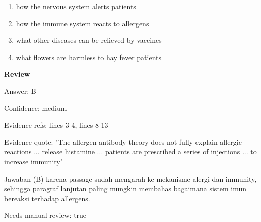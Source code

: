 \documentclass[12pt]{article}
\begin{document}
\begin{enumerate}[label=(\Alph*),leftmargin=*,itemsep=0.2em]
\item how the nervous system alerts patients
\item how the immune system reacts to allergens
\item what other diseases can be relieved by vaccines
\item what flowers are harmless to hay fever patients
\end{enumerate}
\par
\begingroup
\setlength{\parskip}{0pt}
\setlength{\parindent}{0pt}
\textbf{Review}\par
Answer: B\par
Confidence: medium\par
Evidence refs: lines 3-4, lines 8-13\par
Evidence quote: "The allergen-antibody theory does not fully explain allergic reactions ... release histamine ... patients are prescribed a series of injections ... to increase immunity"\par
Jawaban (B) karena passage sudah mengarah ke mekanisme alergi dan immunity, sehingga paragraf lanjutan paling mungkin membahas bagaimana sistem imun bereaksi terhadap allergens.\par
Needs manual review: true\par
\endgroup
\par
\vspace{0.25\baselineskip}
\end{document}
